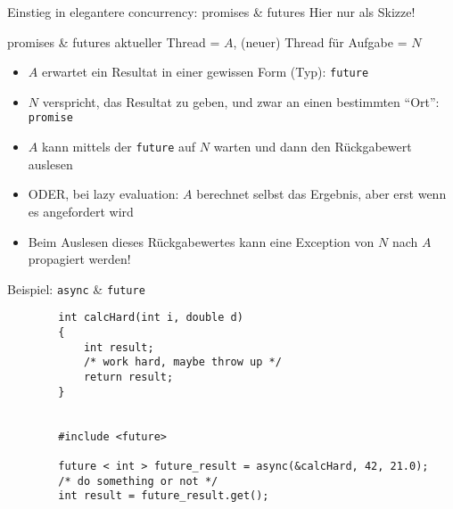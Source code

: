 \begin{frame}{Einstieg in elegantere concurrency: promises \& futures}
	Hier nur als Skizze!
	
	\begin{block}{promises \& futures}
		aktueller Thread = $A$, (neuer) Thread für Aufgabe = $N$
		\begin{itemize}
			\item $A$ erwartet ein Resultat in einer gewissen Form (Typ): \texttt{future}
			\item $N$ verspricht, das Resultat zu geben, und zwar an einen bestimmten \enquote{Ort}: \texttt{promise}
			\item<2-> $A$ kann mittels der \texttt{future} auf $N$ warten und dann den Rückgabewert auslesen
			\item<2-> ODER, bei lazy evaluation: $A$ berechnet selbst das Ergebnis, aber erst wenn es angefordert wird
			\item<3-> Beim Auslesen dieses Rückgabewertes kann eine Exception von $N$ nach $A$ propagiert werden!
		\end{itemize}
	\end{block}
\end{frame}

\begin{frame}[fragile]{ Beispiel: \texttt{async} \& \texttt{future} }
	\begin{lstlisting}
		int calcHard(int i, double d)
		{
		    int result;
		    /* work hard, maybe throw up */
		    return result;
		}
		
		
		#include <future>
		
		future < int > future_result = async(&calcHard, 42, 21.0);
		/* do something or not */
		int result = future_result.get();
	\end{lstlisting}
\end{frame}

